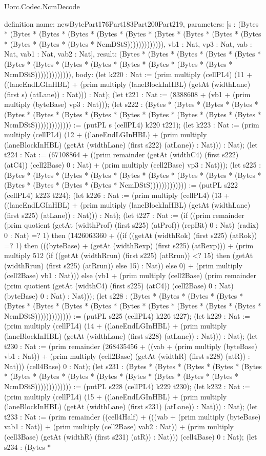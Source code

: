\begin{lexlean}{Uorc.Codec.NcmDecode}
\begin{semanticmodule}
definition{
  name: newBytePart176Part183Part200Part219,
  parameters: [s : (Bytes * (Bytes * (Bytes * (Bytes * (Bytes * (Bytes * (Bytes * (Bytes * (Bytes * (Bytes * (Bytes * (Bytes * (Bytes * NcmDStS))))))))))))), vb1 : Nat, vp3 : Nat, vab : Nat, vab1 : Nat, vab2 : Nat],
  result: (Bytes * (Bytes * (Bytes * (Bytes * (Bytes * (Bytes * (Bytes * (Bytes * (Bytes * (Bytes * (Bytes * (Bytes * (Bytes * NcmDStS))))))))))))),
  body: (let k220 : Nat := (prim multiply (cellPL4) (11 + ((laneEndLGInHBL) + (prim multiply (laneBlockInHBL) (getAt (widthLane) (first s) (atLane)) : Nat))) : Nat); (let t221 : Nat := (8388608 + (vb1 + (prim multiply (byteBase) vp3 : Nat))); (let s222 : (Bytes * (Bytes * (Bytes * (Bytes * (Bytes * (Bytes * (Bytes * (Bytes * (Bytes * (Bytes * (Bytes * (Bytes * (Bytes * NcmDStS))))))))))))) := (putPL s (cellPL4) k220 t221); (let k223 : Nat := (prim multiply (cellPL4) (12 + ((laneEndLGInHBL) + (prim multiply (laneBlockInHBL) (getAt (widthLane) (first s222) (atLane)) : Nat))) : Nat); (let t224 : Nat := (67108864 + ((prim remainder (getAt (widthC4) (first s222) (atC4)) (cell2Base) 0 : Nat) + (prim multiply (cell2Base) vp3 : Nat))); (let s225 : (Bytes * (Bytes * (Bytes * (Bytes * (Bytes * (Bytes * (Bytes * (Bytes * (Bytes * (Bytes * (Bytes * (Bytes * (Bytes * NcmDStS))))))))))))) := (putPL s222 (cellPL4) k223 t224); (let k226 : Nat := (prim multiply (cellPL4) (13 + ((laneEndLGInHBL) + (prim multiply (laneBlockInHBL) (getAt (widthLane) (first s225) (atLane)) : Nat))) : Nat); (let t227 : Nat := (if ((prim remainder (prim quotient (getAt (widthProf) (first s225) (atProf)) (repBit) 0 : Nat) (radix) 0 : Nat) =? 1) then (1426063360 + ((if ((getAt (widthRok) (first s225) (atRok)) =? 1) then (((byteBase) + (getAt (widthRexp) (first s225) (atRexp))) + (prim multiply 512 (if ((getAt (widthRrun) (first s225) (atRrun)) <? 15) then (getAt (widthRrun) (first s225) (atRrun)) else 15) : Nat)) else 0) + (prim multiply (cell2Base) vb1 : Nat))) else (vb1 + (prim multiply (cell2Base) (prim remainder (prim quotient (getAt (widthC4) (first s225) (atC4)) (cell2Base) 0 : Nat) (byteBase) 0 : Nat) : Nat))); (let s228 : (Bytes * (Bytes * (Bytes * (Bytes * (Bytes * (Bytes * (Bytes * (Bytes * (Bytes * (Bytes * (Bytes * (Bytes * (Bytes * NcmDStS))))))))))))) := (putPL s225 (cellPL4) k226 t227); (let k229 : Nat := (prim multiply (cellPL4) (14 + ((laneEndLGInHBL) + (prim multiply (laneBlockInHBL) (getAt (widthLane) (first s228) (atLane)) : Nat))) : Nat); (let t230 : Nat := (prim remainder (268435456 + ((vab + (prim multiply (byteBase) vb1 : Nat)) + (prim multiply (cell2Base) (getAt (widthR) (first s228) (atR)) : Nat))) (cell4Base) 0 : Nat); (let s231 : (Bytes * (Bytes * (Bytes * (Bytes * (Bytes * (Bytes * (Bytes * (Bytes * (Bytes * (Bytes * (Bytes * (Bytes * (Bytes * NcmDStS))))))))))))) := (putPL s228 (cellPL4) k229 t230); (let k232 : Nat := (prim multiply (cellPL4) (15 + ((laneEndLGInHBL) + (prim multiply (laneBlockInHBL) (getAt (widthLane) (first s231) (atLane)) : Nat))) : Nat); (let t233 : Nat := (prim remainder ((cell4Half) + (((vab + (prim multiply (byteBase) vab1 : Nat)) + (prim multiply (cell2Base) vab2 : Nat)) + (prim multiply (cell3Base) (getAt (widthR) (first s231) (atR)) : Nat))) (cell4Base) 0 : Nat); (let s234 : (Bytes * }
\end{semanticmodule}
\end{lexlean}
